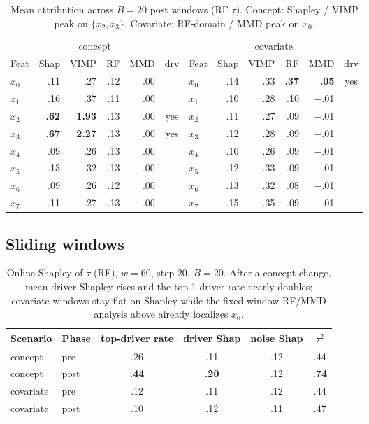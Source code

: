 \documentclass[11pt]{article}
\begin{document}
\begin{table}[ht]
\centering
\caption{Mean attribution across $B{=}20$ post windows (RF $\tau$).
Concept: Shapley / VIMP peak on $\{x_2,x_3\}$.
Covariate: RF-domain / MMD peak on $x_0$.}
\label{tab:feat}
\scriptsize
\begin{tabular}{l rrrr c | l rrrr c}
\toprule
\multicolumn{6}{c|}{concept} & \multicolumn{6}{c}{covariate} \\
\cmidrule(lr){1-6}\cmidrule(lr){7-12}
Feat & Shap & VIMP & RF & MMD & drv
& Feat & Shap & VIMP & RF & MMD & drv \\
\midrule
$x_0$ & .11 & .27 & .12 & .00 &
& $x_0$ & .14 & .33 & \textbf{.37} & \textbf{.05} & yes \\
$x_1$ & .16 & .37 & .11 & .00 &
& $x_1$ & .10 & .28 & .10 & $-$.01 & \\
$x_2$ & \textbf{.62} & \textbf{1.93} & .13 & .00 & yes
& $x_2$ & .11 & .27 & .09 & $-$.01 & \\
$x_3$ & \textbf{.67} & \textbf{2.27} & .13 & .00 & yes
& $x_3$ & .12 & .28 & .09 & $-$.01 & \\
$x_4$ & .09 & .26 & .13 & .00 &
& $x_4$ & .10 & .26 & .09 & $-$.01 & \\
$x_5$ & .13 & .32 & .13 & .00 &
& $x_5$ & .12 & .33 & .09 & $-$.01 & \\
$x_6$ & .09 & .26 & .12 & .00 &
& $x_6$ & .13 & .32 & .08 & $-$.01 & \\
$x_7$ & .11 & .27 & .13 & .00 &
& $x_7$ & .15 & .35 & .09 & $-$.01 & \\
\bottomrule
\end{tabular}
\end{table}

\subsection{Sliding windows}

\begin{table}[ht]
\centering
\caption{Online Shapley of $\tau$ (RF), $w{=}60$, step $20$, $B{=}20$.
After a concept change, mean driver Shapley rises and the top-1 driver
rate nearly doubles; covariate windows stay flat on Shapley while the
fixed-window RF/MMD analysis above already localizes $x_0$.}
\label{tab:slide}
\begin{tabular}{ll cccc}
\toprule
Scenario & Phase & top-driver rate & driver Shap & noise Shap & $\tau^2$ \\
\midrule
concept & pre  & .26 & .11 & .12 & .44 \\
concept & post & \textbf{.44} & \textbf{.20} & .12 & \textbf{.74} \\
covariate & pre  & .12 & .11 & .12 & .44 \\
covariate & post & .10 & .12 & .11 & .47 \\
\bottomrule
\end{tabular}
\end{table}
\end{document}
